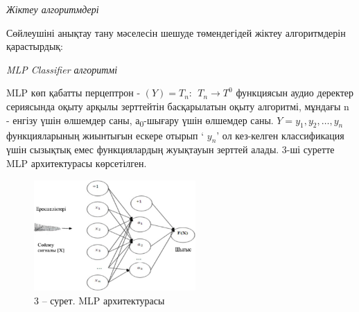 \begin{multicols}{2}
\emph{Жіктеу алгоритмдері}

Сөйлеушіні анықтау тану мәселесін шешуде төмендегідей жіктеу
алгоритмдерін қарастырдық:

\emph{MLP Classifier алгоритмі}

MLP көп қабатты перцептрон -
\((Y) = T_{n}:{\ \ T}_{n} \rightarrow T^{0}\) функциясын аудио деректер
сериясында оқыту арқылы зерттейтін басқарылатын оқыту алгоритмі, мұндағы
n - енгізу үшін өлшемдер саны, а\textsubscript{0}-шығару үшін өлшемдер
саны. \(Y = y_{1},y_{2},\ldots,y_{n}\) функцияларының жиынтығын ескере
отырып ` \(y_{n}\)' ол кез-келген классификация үшін сызықтық емес
функциялардың жуықтауын зерттей алады. 3-ші суретте MLP архитектурасы
көрсетілген.
\end{multicols}

\begin{figure}[H]
	\centering
	\includegraphics[width=0.55\textwidth]{media/ict/image7}
	\caption*{3 – сурет. MLP архитектурасы}
\end{figure}


